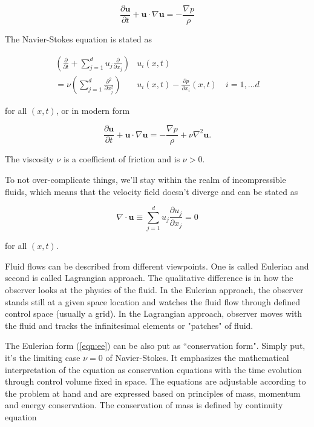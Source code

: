 \begin{equation} 
	\label{eqn:ee-modern}
	\frac{\partial \bm{u}}{\partial t} + \bm{u} \cdot \nabla \bm{u} = - \frac{\nabla p}{\rho}
\end{equation}

The Navier-Stokes equation is stated as

\begin{align} 
	\label{eqn:ns}
	\left(\frac{\partial}{\partial t} + \sum_{j=1}^{d} u_j \frac{\partial}{\partial x_j}\right) &u_i(x,t) \\
	 = \nu \left(\sum_{j=1}^{d} \frac{\partial^2}{\partial x_j^2}\right) &u_i(x,t) - \frac{\partial p}{\partial x_i} (x,t) \quad  i = 1,...d
\end{align}

for all $(x, t)$, or in modern form

\begin{equation} 
	\label{eqn:ns-modern}
	\frac{\partial \bm{u}}{\partial t} + \bm{u} \cdot \nabla \bm{u} = - \frac{\nabla p}{\rho} + \nu \nabla^2 \bm{u}.
\end{equation}

The viscosity $\nu$ is a coefficient of friction and is $\nu  > 0$.

To not over-complicate things, we'll stay within the realm of incompressible fluids, which means that the velocity field doesn't diverge and can be stated as

\begin{equation} 
	\label{eqn:div-u}
	\nabla \cdot \bm{u} \equiv \sum_{j=1}^{d} u_j \frac{\partial u_j}{\partial x_j}= 0
\end{equation}

for all $(x, t)$.

Fluid flows can be described from different viewpoints. One is called Eulerian and second is called Lagrangian approach. The qualitative difference is in how the observer looks at the physics of the fluid. In the Eulerian approach, the observer stands still at a given space location and watches the fluid flow through defined control space (usually a grid). In the Lagrangian approach, observer moves with the fluid and tracks the infinitesimal elements or "patches" of fluid.

The Eulerian form (\ref{eqn:ee}) can be also put as ``conservation form". Simply put, it's the limiting case $\nu = 0$ of Navier-Stokes. It emphasizes the mathematical interpretation of the equation as conservation equations with the time evolution through control volume fixed in space. The equations are adjustable according to the problem at hand and are expressed based on principles of mass, momentum and energy conservation. The conservation of mass is defined by continuity equation

